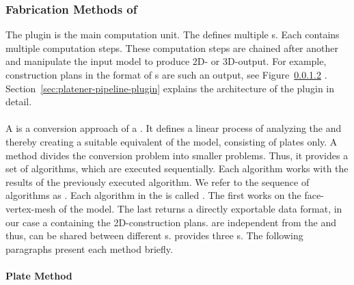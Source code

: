 \documentclass[../ClassicThesis.tex]{subfiles}
\begin{document}

\subsubsection{Fabrication Methods of {\platener}}

The  plugin is the main computation
unit. The  defines multiple {\fabmethod}s.
Each {\fabmethod} contains multiple computation steps. These
computation steps are chained after another and manipulate
the input model to produce 2D- or 3D-output. For example,
construction plans in the format of {\svgfile}s are such an
output, see Figure~\ref{} .
Section~\ref{sec:platener-pipeline-plugin} explains the
architecture of the  plugin in
detail.


\paragraph{}

A {\fabmethod} is a conversion approach of a {\threedmodel}.
It defines a linear process of analyzing the {\threedmodel}
and thereby creating a suitable equivalent of the model,
consisting of plates only. A {\fabrication} method divides
the conversion problem into smaller problems. Thus, it
provides a set of algorithms, which are executed
sequentially. Each algorithm works with the results of the
previously executed algorithm. We refer to the sequence of
algorithms as . Each algorithm in the
 is called . The first
 works on the face-vertex-mesh of the
model. The last  returns a directly
exportable data format, in our case a {\zipfile} containing
the 2D-construction plans.  are
independent from the {\fabmethod} and thus, can be shared
between different {\fabmethod}s. {\platener} provides three
{\fabmethod}s. The following paragraphs present each method
briefly.

\paragraph{Plate Method}
\end{document}
